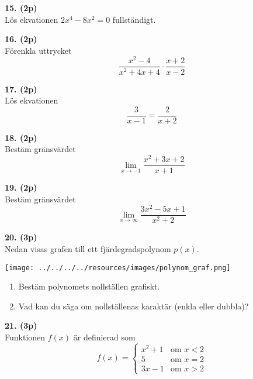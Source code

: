 \documentclass[12pt]{article}
\begin{document}
\vspace{0.5cm}

\noindent
\textbf{15. (2p)} \\
Lös ekvationen $2x^4 - 8x^2 = 0$ fullständigt.

\vspace{0.5cm}

\noindent
\textbf{16. (2p)} \\
Förenkla uttrycket
\[
\frac{x^2 - 4}{x^2 + 4x + 4} \cdot \frac{x + 2}{x - 2}
\]

\vspace{0.5cm}

\noindent
\textbf{17. (2p)} \\
Lös ekvationen
\[
\frac{3}{x - 1} = \frac{2}{x + 2}
\]

\vspace{0.5cm}

\noindent
\textbf{18. (2p)} \\
Bestäm gränsvärdet
\[
\lim_{x \to -1} \frac{x^2 + 3x + 2}{x + 1}
\]

\vspace{0.5cm}

\noindent
\textbf{19. (2p)} \\
Bestäm gränsvärdet
\[
\lim_{x \to \infty} \frac{3x^2 - 5x + 1}{x^2 + 2}
\]

\vspace{0.5cm}

\noindent
\textbf{20. (3p)} \\
Nedan visas grafen till ett fjärdegradspolynom $p(x)$.

\begin{center}
\texttt{[image: ../../../../resources/images/polynom\_graf.png]}
\end{center}

\begin{enumerate}[label=\alph*)]
    \item Bestäm polynomets nollställen grafiskt.
    \item Vad kan du säga om nollställenas karaktär (enkla eller dubbla)?
\end{enumerate}

\vspace{0.5cm}

\noindent
\textbf{21. (3p)} \\
Funktionen $f(x)$ är definierad som
\[
f(x) = \begin{cases}
x^2 + 1 & \text{om } x < 2 \\
5 & \text{om } x = 2 \\
3x - 1 & \text{om } x > 2
\end{cases}
\]
\end{document}
